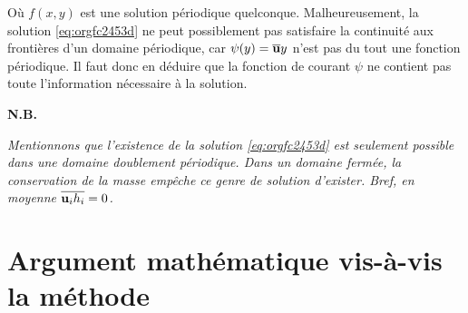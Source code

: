 \documentclass[10pt]{article}
\numberwithin{equation}{section}
\newcommand{\uu}{\vb{u}}
\begin{document}
Où \(f(x,y)\) est une solution périodique quelconque. 
Malheureusement, la solution \ref{eq:orgfc2453d} ne peut possiblement pas satisfaire la continuité aux frontières d'un domaine périodique, car \(\psi(y) = \overline{\uu} y\) n'est pas du tout une fonction périodique.
Il faut donc en déduire que la fonction de courant \(\psi\) ne contient pas toute l'information nécessaire à la solution.\bigskip

\textbf{N.B.\ } \begin{minipage}[t]{0.94\linewidth}
   \itshape Mentionnons que l'existence de la solution \ref{eq:orgfc2453d} est seulement possible dans une domaine doublement périodique.
   Dans un domaine fermée, la conservation de la masse empêche ce genre de solution d'exister. Bref, en moyenne \(\overline{\uu_i h_i} = 0\).
\end{minipage}


\section{Argument mathématique vis-à-vis la méthode}
\label{sec:org5a8ffd6}
\end{document}
